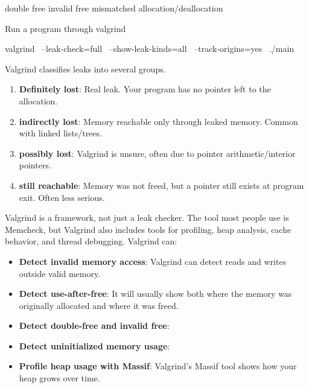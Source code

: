 \documentclass{report}
\begin{document}
\begin{itemize}
\begin{itemize}
                    double free
                    invalid free
                    mismatched allocation/deallocation
                \end{itemize}
                Run a program through valgrind
                \bigbreak \noindent 
                \begin{bashcode}
                    valgrind \
                        --leak-check=full \
                        --show-leak-kinds=all \
                        --track-origins=yes \
                        ./main
                \end{bashcode}
                \bigbreak \noindent 
                Valgrind classifies leaks into several groups.
                \begin{enumerate}
                    \item \textbf{Definitely lost}:	Real leak. Your program has no pointer left to the allocation.
                    \item \textbf{indirectly lost}:	Memory reachable only through leaked memory. Common with linked lists/trees.
                    \item \textbf{possibly lost}:	Valgrind is unsure, often due to pointer arithmetic/interior pointers.
                    \item \textbf{still reachable}:	Memory was not freed, but a pointer still exists at program exit. Often less serious.
                \end{enumerate}
                Valgrind is a framework, not just a leak checker. The tool most people use is Memcheck, but Valgrind also includes tools for profiling, heap analysis, cache behavior, and thread debugging. Valgrind can:
                \begin{itemize}
                    \item \textbf{Detect invalid memory access}: Valgrind can detect reads and writes outside valid memory.    
                    \item \textbf{Detect use-after-free}: It will usually show both where the memory was originally allocated and where it was freed.
                    \item \textbf{Detect double-free and invalid free}:
                    \item \textbf{Detect uninitialized memory usage}: 
                    \item \textbf{Profile heap usage with Massif}: Valgrind’s Massif tool shows how your heap grows over time.
                        \bigbreak \noindent 

\end{itemize}
\end{itemize}
\end{document}
